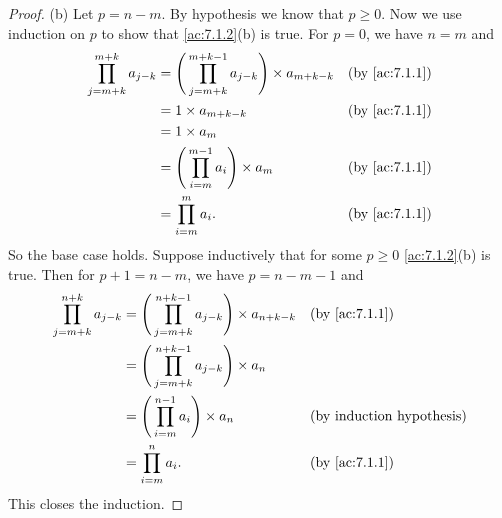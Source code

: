 \begin{proof}{(b)}
  Let \(p = n - m\).
  By hypothesis we know that \(p \geq 0\).
  Now we use induction on \(p\) to show that \cref{ac:7.1.2}(b) is true.
  For \(p = 0\), we have \(n = m\) and
  \begin{align*}
    \prod_{j = m + k}^{m + k} a_{j - k} & = \Bigg(\prod_{j = m + k}^{m + k - 1} a_{j - k}\Bigg) \times a_{m + k - k} &  & \text{(by \cref{ac:7.1.1})} \\
                                        & = 1 \times a_{m + k - k}                                                   &  & \text{(by \cref{ac:7.1.1})} \\
                                        & = 1 \times a_m                                                                                              \\
                                        & = \Bigg(\prod_{i = m}^{m - 1} a_i\Bigg) \times a_m                         &  & \text{(by \cref{ac:7.1.1})} \\
                                        & = \prod_{i = m}^m a_i.                                                     &  & \text{(by \cref{ac:7.1.1})}
  \end{align*}
  So the base case holds.
  Suppose inductively that for some \(p \geq 0\) \cref{ac:7.1.2}(b) is true.
  Then for \(p + 1 = n - m\), we have \(p = n - m - 1\) and
  \begin{align*}
    \prod_{j = m + k}^{n + k} a_{j - k} & = \Bigg(\prod_{j = m + k}^{n + k - 1} a_{j - k}\Bigg) \times a_{n + k - k} &  & \text{(by \cref{ac:7.1.1})}      \\
                                        & = \Bigg(\prod_{j = m + k}^{n + k - 1} a_{j - k}\Bigg) \times a_n                                                 \\
                                        & = \Bigg(\prod_{i = m}^{n - 1} a_i\Bigg) \times a_n                         &  & \text{(by induction hypothesis)} \\
                                        & = \prod_{i = m}^n a_i.                                                     &  & \text{(by \cref{ac:7.1.1})}
  \end{align*}
  This closes the induction.
\end{proof}


